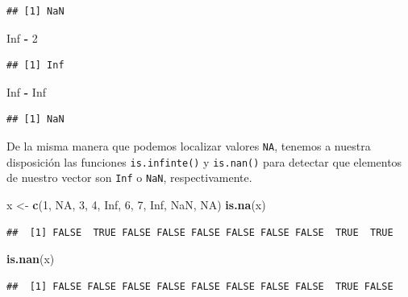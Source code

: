 \documentclass[11pt,]{book}
\newenvironment{Shaded}{\begin{snugshade}}{\end{snugshade}}
\newcommand{\DecValTok}[1]{\textcolor[rgb]{0.06,0.06,0.06}{#1}}
\newcommand{\KeywordTok}[1]{\textcolor[rgb]{0.27,0.27,0.27}{\textbf{#1}}}
\newcommand{\NormalTok}[1]{#1}
\newcommand{\OperatorTok}[1]{\textcolor[rgb]{0.43,0.43,0.43}{\textbf{#1}}}
\newcommand{\OtherTok}[1]{\textcolor[rgb]{0.37,0.37,0.37}{#1}}
\newcommand{\StringTok}[1]{\textcolor[rgb]{0.5,0.5,0.5}{#1}}
\begin{document}
\begin{verbatim}
## [1] NaN
\end{verbatim}

\begin{Shaded}
\begin{Highlighting}[]
\OtherTok{Inf} \OperatorTok{-}\StringTok{ }\DecValTok{2}
\end{Highlighting}
\end{Shaded}

\begin{verbatim}
## [1] Inf
\end{verbatim}

\begin{Shaded}
\begin{Highlighting}[]
\OtherTok{Inf} \OperatorTok{-}\StringTok{ }\OtherTok{Inf}
\end{Highlighting}
\end{Shaded}

\begin{verbatim}
## [1] NaN
\end{verbatim}

De la misma manera que podemos localizar valores \texttt{NA}, tenemos a nuestra disposición las funciones \texttt{is.infinte()} y \texttt{is.nan()} para detectar que elementos de nuestro vector son \texttt{Inf} o \texttt{NaN}, respectivamente.

\begin{Shaded}
\begin{Highlighting}[]
\NormalTok{x <-}\StringTok{ }\KeywordTok{c}\NormalTok{(}\DecValTok{1}\NormalTok{, }\OtherTok{NA}\NormalTok{, }\DecValTok{3}\NormalTok{, }\DecValTok{4}\NormalTok{, }\OtherTok{Inf}\NormalTok{, }\DecValTok{6}\NormalTok{, }\DecValTok{7}\NormalTok{, }\OtherTok{Inf}\NormalTok{, }\OtherTok{NaN}\NormalTok{, }\OtherTok{NA}\NormalTok{)}
\KeywordTok{is.na}\NormalTok{(x)}
\end{Highlighting}
\end{Shaded}

\begin{verbatim}
##  [1] FALSE  TRUE FALSE FALSE FALSE FALSE FALSE FALSE  TRUE  TRUE
\end{verbatim}

\begin{Shaded}
\begin{Highlighting}[]
\KeywordTok{is.nan}\NormalTok{(x)}
\end{Highlighting}
\end{Shaded}

\begin{verbatim}
##  [1] FALSE FALSE FALSE FALSE FALSE FALSE FALSE FALSE  TRUE FALSE
\end{verbatim}
\end{document}
